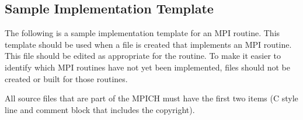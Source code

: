 \documentclass{article}
\begin{document}
\subsection{Sample Implementation Template}
\label{sec:template}

The following is a sample implementation template for an MPI routine.
This template should be used when a file is created that implements an
MPI routine.  This file should be edited as appropriate for the
routine.  To make it easier to identify which MPI routines have not
yet been implemented, files should not be created or built for those routines.

All source files that are part of the MPICH must have the first two
items (C style line and comment block that includes the copyright).
\end{document}
